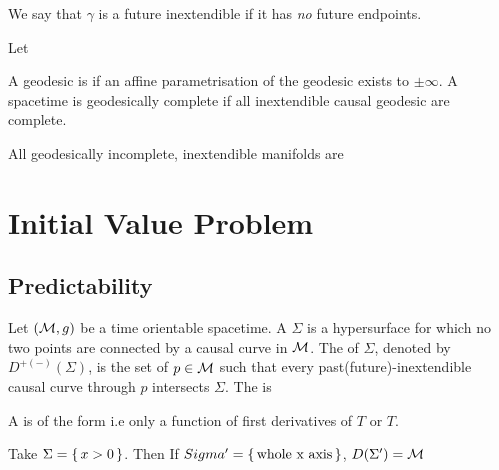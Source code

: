 \documentclass{article}
\begin{document}
We say that $\gamma$ is a future inextendible if it has \emph{no} future endpoints. 
\begin{example}
Let 
\end{example}

\begin{definition}
A geodesic is  if an affine parametrisation of the geodesic exists to $\pm\infty$. A spacetime is geodesically complete if all inextendible causal geodesic are complete. 
\end{definition}

\begin{theorem}
All geodesically incomplete, inextendible manifolds are 
\end{theorem}

\section{Initial Value Problem}
\subsection{Predictability}
\begin{definition}
Let $(\mathcal{M},g)$ be a time orientable spacetime. A  $\Sigma$ is a hypersurface for which no two points are connected by a causal curve in $\mathcal{M}$. The  of $\Sigma$, denoted by $D^{+(-)}(\Sigma)$, is the set of $p\in\mathcal{M}$ such that every past(future)-inextendible causal curve through $p$ intersects $\Sigma$. The  is 
\end{definition}

\begin{definition}
A  is of the form 
i.e only a function of  first derivatives of $T$ or $T$.
\end{definition}

\begin{example}
Take $\Sigma = \set{x>0}$. Then 
If $Sigma^\prime=\set{\text{whole x axis}}$, $D(\Sigma^\prime)=\mathcal{M}$
\end{example}
\end{document}

